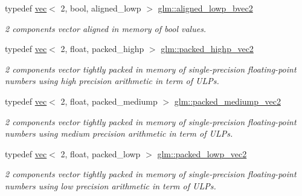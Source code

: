 \begin{DoxyCompactItemize}
typedef \hyperlink{structglm_1_1vec}{vec}$<$ 2, bool, aligned\+\_\+lowp $>$ \hyperlink{group__gtc__type__aligned_ga8118d4ac245590bb8c4dfcad9b7632ee}{glm\+::aligned\+\_\+lowp\+\_\+bvec2}
\begin{DoxyCompactList}\small\item\em 2 components vector aligned in memory of bool values. \end{DoxyCompactList}\item 
\mbox{\label{group__gtc__type__aligned_ga15068ebf3dae2c205d90b1d36780bf9b}} 
typedef \hyperlink{structglm_1_1vec}{vec}$<$ 2, float, packed\+\_\+highp $>$ \hyperlink{group__gtc__type__aligned_ga15068ebf3dae2c205d90b1d36780bf9b}{glm\+::packed\+\_\+highp\+\_\+vec2}
\begin{DoxyCompactList}\small\item\em 2 components vector tightly packed in memory of single-\/precision floating-\/point numbers using high precision arithmetic in term of U\+L\+Ps. \end{DoxyCompactList}\item 
\mbox{\label{group__gtc__type__aligned_ga16f6a2ad499160b96c263f7f216a70e2}} 
typedef \hyperlink{structglm_1_1vec}{vec}$<$ 2, float, packed\+\_\+mediump $>$ \hyperlink{group__gtc__type__aligned_ga16f6a2ad499160b96c263f7f216a70e2}{glm\+::packed\+\_\+mediump\+\_\+vec2}
\begin{DoxyCompactList}\small\item\em 2 components vector tightly packed in memory of single-\/precision floating-\/point numbers using medium precision arithmetic in term of U\+L\+Ps. \end{DoxyCompactList}\item 
\mbox{\label{group__gtc__type__aligned_ga5457fdfd08276277a86cb27e1da6aa9c}} 
typedef \hyperlink{structglm_1_1vec}{vec}$<$ 2, float, packed\+\_\+lowp $>$ \hyperlink{group__gtc__type__aligned_ga5457fdfd08276277a86cb27e1da6aa9c}{glm\+::packed\+\_\+lowp\+\_\+vec2}
\begin{DoxyCompactList}\small\item\em 2 components vector tightly packed in memory of single-\/precision floating-\/point numbers using low precision arithmetic in term of U\+L\+Ps. \end{DoxyCompactList}\item 
\mbox{\label{group__gtc__type__aligned_ga8c26414d99b8996aa7dc73e1dc8a06bd}} 

\end{DoxyCompactItemize}

